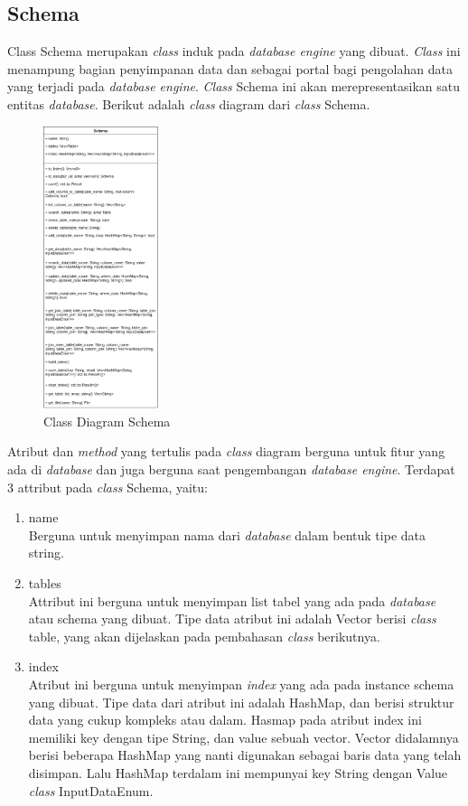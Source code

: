 \subsection{Schema}
Class Schema merupakan \emph{class} induk pada \emph{database engine} yang dibuat. \emph{Class} ini menampung bagian penyimpanan data dan sebagai portal bagi pengolahan
data yang terjadi pada \emph{database engine}. \emph{Class} Schema ini akan merepresentasikan satu entitas \emph{database}. Berikut adalah \emph{class} diagram dari \emph{class} Schema.
\begin{figure}[H]
  \centering{}
	\includegraphics[width=0.3\textwidth]{gambar/bab4/Schema}
  \caption{Class Diagram Schema}
\end{figure}

Atribut dan \emph{method} yang tertulis pada \emph{class} diagram berguna untuk fitur yang ada di \emph{database} dan juga berguna saat pengembangan \emph{database engine}.
Terdapat 3 attribut pada \emph{class} Schema, yaitu:
\begin{enumerate}
	\item name \\
	Berguna untuk menyimpan nama dari \emph{database} dalam bentuk tipe data string.

	\item tables \\
	Attribut ini berguna untuk menyimpan list tabel yang ada pada \emph{database} atau schema yang dibuat. Tipe data atribut ini adalah Vector berisi \emph{class} table, yang akan 
  dijelaskan pada pembahasan \emph{class} berikutnya. 

	\item index  \\
	Atribut ini berguna untuk menyimpan \emph{index} yang ada pada instance schema yang dibuat. Tipe data dari atribut ini adalah HashMap, dan berisi
  struktur data yang cukup kompleks atau dalam. Hasmap pada atribut index ini memiliki key dengan tipe String, dan value sebuah vector. Vector didalamnya
  berisi beberapa HashMap yang nanti digunakan sebagai baris data yang telah disimpan. Lalu HashMap terdalam ini mempunyai key String dengan Value \emph{class} InputDataEnum.
			
\end{enumerate}

